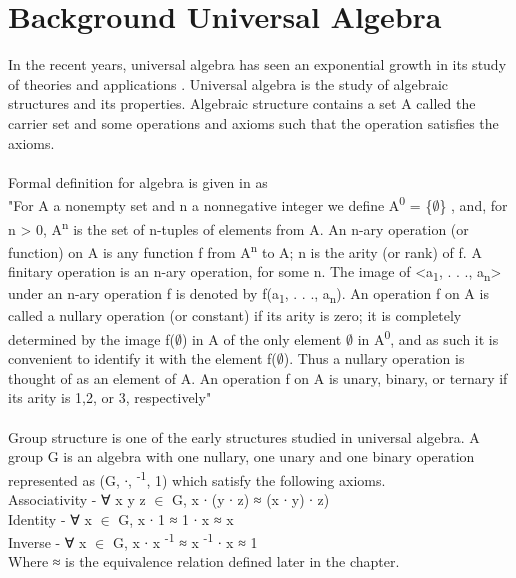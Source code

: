 \chapter{Background Universal Algebra}

In the recent years, universal algebra has seen an exponential growth in its study of theories and applications \cite{sankappanavar1981course}. Universal algebra is the study of algebraic structures and its properties. Algebraic structure contains a set A called the carrier set and some operations and axioms such that the operation satisfies the axioms. \\ \\
Formal definition for algebra is given in \cite{sankappanavar1981course} as \\ "For A a nonempty set and n a nonnegative integer we define A\textsuperscript{0} = \{\(\emptyset\)\} , and, for n > 0, A\textsuperscript{n} is the set of n-tuples of elements from A. An n-ary operation (or function) on A is any function f from A\textsuperscript{n} to A; n is the arity (or rank) of f. A finitary operation is an n-ary operation, for some n. The image of <a\textsubscript{1}, . . ., a\textsubscript{n}> under an n-ary operation f is denoted by f(a\textsubscript{1}, . . ., a\textsubscript{n}). An operation f on A is called a nullary operation (or constant) if its arity is zero; it is completely determined by the image f(\(\emptyset\)) in A of the only element \(\emptyset\) in A\textsuperscript{0}, and as such it is convenient to identify it with the element f(\(\emptyset\)). Thus a nullary operation is thought of as an element of A. An operation f on A is unary, binary, or ternary if its arity is 1,2, or 3, respectively"\\ \\
Group structure is one of the early structures studied in universal algebra. A group G is an algebra with one nullary, one unary and one binary operation represented as (G, ∙, \textsuperscript{-1}, 1) which satisfy the following axioms. \\
Associativity - ∀ x y z \(\in\) G, x ∙ (y ∙ z) ≈ (x ∙ y) ∙ z)\\
Identity - ∀ x \(\in\) G, x ∙ 1 ≈ 1 ∙ x ≈ x\\
Inverse - ∀ x \(\in\) G, x ∙ x \textsuperscript{-1} ≈  x \textsuperscript{-1} ∙ x ≈ 1\\
Where ≈ is the equivalence relation defined later in the chapter.

